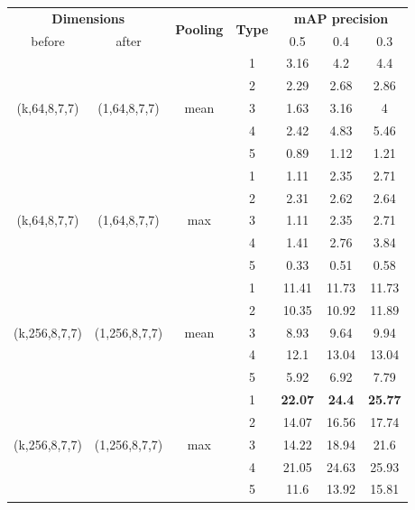 \documentclass{report}
\begin{document}
\begin{center}
\begin{longtable}{||c | c | c| c||c c c||}

  \hline
  \multicolumn{2}{||c|}{\textbf{Dimensions}} & \multirow{2}{*}{ \textbf{Pooling}} &\multirow{2}{*}{\textbf{Type}} & \multicolumn{3}{|c||}{\textbf{mAP precision}}\\

   before & after &  {} & {} &  0.5 &  0.4 & 0.3 \\
 \hline   \hline
 \multirow{5}{*}{(k,64,8,7,7)} & \multirow{5}{*}{(1,64,8,7,7)} & \multirow{5}{*}{mean}  & 1 &  3.16 & 4.2 & 4.4    \\
  \cline{4-7}
  {} & {} & {} & 2 & 2.29 & 2.68 & 2.86    \\
    \cline{4-7}
  {} & {} & {} & 3 & 1.63 & 3.16 &  4  \\
    \cline{4-7}
  {} & {} & {} & 4 & 2.42 & 4.83 & 5.46  \\  
    \cline{4-7}
  {} & {} & {} & 5 & 0.89 &1.12 & 1.21  \\
  \hline
 \multirow{5}{*}{(k,64,8,7,7)} & \multirow{5}{*}{(1,64,8,7,7)} & \multirow{5}{*}{max}  & 1 & 1.11 & 2.35 & 2.71 \\
    \cline{4-7}
  {} & {} & {} & 2 & 2.31 & 2.62 & 2.64 \\
    \cline{4-7}
  {} & {} & {} & 3 & 1.11 & 2.35 & 2.71 \\
    \cline{4-7}
  {} & {} & {} & 4 & 1.41 & 2.76 & 3.84  \\
    \cline{4-7}
  {} & {} & {} & 5 & 0.33 & 0.51 &0.58  \\

  \hline   \hline

 \multirow{5}{*}{(k,256,8,7,7)} & \multirow{5}{*}{(1,256,8,7,7)} & \multirow{5}{*}{mean}  & 1 &  11.41 & 11.73 & 11.73 \\

    \cline{4-7}
  {} & {} & {} & 2 & 10.35 & 10.92 &11.89 \\
    \cline{4-7}
  {} & {} & {} & 3 & 8.93 & 9.64 & 9.94 \\
    \cline{4-7}
  {} & {} & {} & 4 & 12.1 & 13.04 &13.04 \\
    \cline{4-7}
  {} & {} & {} & 5 & 5.92 & 6.92 & 7.79 \\
    \hline
 \multirow{5}{*}{(k,256,8,7,7)} & \multirow{5}{*}{(1,256,8,7,7)} & \multirow{5}{*}{max}  & 1  & \textbf{22.07} & \textbf{24.4} &  \textbf{25.77} \\
    \cline{4-7}
  {} & {} & {} & 2  & 14.07 & 16.56 & 17.74 \\
    \cline{4-7}
  {} & {} & {} & 3  & 14.22 & 18.94 &21.6 \\
    \cline{4-7}
  {} & {} & {} & 4  & 21.05 & 24.63 & 25.93 \\
    \cline{4-7}
  {} & {} & {} & 5  & 11.6 & 13.92 & 15.81 \\
  \hline   
  

\end{longtable}
\end{center}
\end{document}
